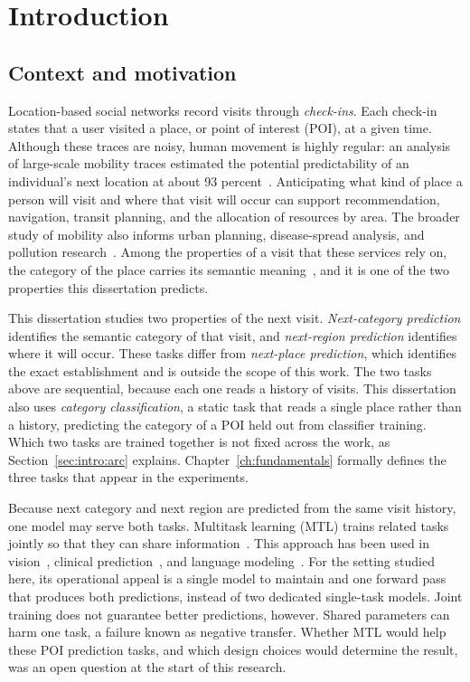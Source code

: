 


\chapter{Introduction}
\label{ch:intro}


\section{Context and motivation}
\label{sec:intro:context}

Location-based social networks record visits through \emph{check-ins}. Each check-in
states that a user visited a place, or point of interest (POI), at a given time.
Although these traces are noisy, human movement is highly regular: an analysis of
large-scale mobility traces estimated the potential predictability of an individual's
next location at about 93 percent~\cite{song2010limits}. Anticipating what kind of
place a person will visit and where that visit will occur can support recommendation,
navigation, transit planning, and the allocation of resources by area. The broader
study of mobility also informs urban planning, disease-spread analysis, and pollution
research~\cite{luca2021mobilitysurvey}. Among the properties of a visit that these
services rely on, the category of the place carries its semantic
meaning~\cite{Xu2023}, and it is one of the two properties this dissertation predicts.

This dissertation studies two properties of the next visit. \emph{Next-category
prediction} identifies the semantic category of that visit, and \emph{next-region
prediction} identifies where it will occur. These tasks differ from \emph{next-place
prediction}, which identifies the exact establishment and is outside the scope of
this work. The two tasks above are sequential, because each one reads a history of
visits. This dissertation also uses \emph{category classification}, a static task
that reads a single place rather than a history, predicting the category of a POI held
out from classifier training. Which two tasks are trained together is not fixed
across the work, as Section~\ref{sec:intro:arc} explains.
Chapter~\ref{ch:fundamentals} formally defines the three tasks that appear in the
experiments.

Because next category and next region are predicted from the same visit history, one
model may serve both tasks. Multitask learning (MTL) trains related tasks jointly so
that they can share information~\cite{caruana1997multitask}. This approach has been
used in vision~\cite{kokkinos2016ubernet}, clinical
prediction~\cite{lipton2015learning}, and language
modeling~\cite{wei2022finetuned}. For the setting studied here, its operational appeal
is a single model to maintain and one forward pass that produces both predictions,
instead of two dedicated single-task models. Joint training does not guarantee better
predictions, however. Shared parameters can harm one task, a failure known as negative
transfer. Whether MTL would help these POI prediction tasks, and which design choices
would determine the result, was an open question at the start of this research.




